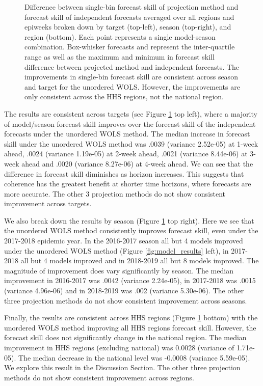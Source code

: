 \documentclass{umassthesis}          %
\begin{document}
\begin{figure}
\caption{ Difference between single-bin forecast skill of projection method and forecast skill of independent forecasts averaged over all regions and epiweeks broken down by target (top-left), season (top-right), and region (bottom). Each point represents a single model-season combination. Box-whisker forecasts and  represent the inter-quartile range as well as the maximum and minimum in forecast skill difference between projected method and independent forecasts. The improvements in single-bin forecast skill are consistent across season and target for the unordered WOLS. However, the improvements are only consistent across the HHS regions, not the national region.}
\label{fig:region_results}
\end{figure}



The results are consistent across targets (see  Figure \ref{fig:region_results} top left), where a majority of model/season forecast skill improves over the forecast skill of the independent forecasts under the unordered WOLS method. The median increase in forecast skill under the unordered WOLS method was .0039 (variance 2.52e-05) at 1-week ahead, .0024 (variance 1.19e-05) at 2-week ahead, .0021 (variance 8.44e-06) at 3-week ahead and .0020 (variance 8.27e-06) at 4-week ahead. We can see that the difference in forecast skill diminishes as horizon increases. This suggests that coherence has the greatest benefit at shorter time horizons, where forecasts are more accurate. The other 3 projection methods do not show consistent improvement across targets.

We also break down the results by season (Figure \ref{fig:region_results} top right). Here we see that the unordered WOLS method consistently improves forecast skill, even under the 2017-2018 epidemic year. In the 2016-2017 season all but 4 models improved under the unordered WOLS method (Figure  \ref{fig:model_results} left), in 2017-2018 all but 4 models improved and in 2018-2019 all but 8 models improved. The magnitude of improvement does vary significantly by season. The median improvement in 2016-2017 was .0042 (variance 2.24e-05), in 2017-2018 was .0015 (variance 4.96e-06) and in 2018-2019 was .002 (variance 5.30e-06). The other three projection methods do not show consistent improvement across seasons.

Finally, the results are consistent across HHS regions (Figure \ref{fig:region_results} bottom) with the unordered WOLS method improving all HHS regions forecast skill. However, the forecast skill does not significantly change in the national region. The median improvement in HHS regions (excluding national) was 0.0028 (variance of 1.71e-05). The median decrease in the national level was -0.0008 (variance 5.59e-05).  We explore this result in the Discussion Section. The other three projection methods do not show consistent improvement across regions. 
\end{document}
